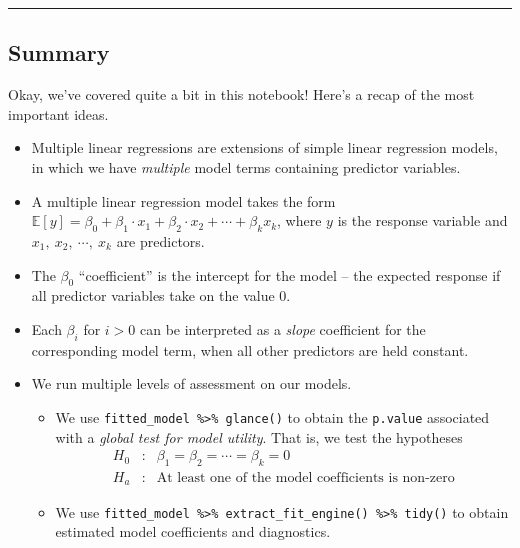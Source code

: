 \documentclass[
  letterpaper,
  DIV=11,
  numbers=noendperiod]{scrartcl}
\begin{document}
\begin{center}\rule{0.5\linewidth}{0.5pt}\end{center}

\subsection{Summary}\label{summary}

Okay, we've covered quite a bit in this notebook! Here's a recap of the
most important ideas.

\begin{itemize}
\item
  Multiple linear regressions are extensions of simple linear regression
  models, in which we have \emph{multiple} model terms containing
  predictor variables.
\item
  A multiple linear regression model takes the form
  \(\mathbb{E}\left[y\right] = \beta_0 + \beta_1\cdot x_1 + \beta_2\cdot x_2 + \cdots + \beta_k x_k\),
  where \(y\) is the response variable and \(x_1,~x_2,~\cdots,~x_k\) are
  predictors.
\item
  The \(\beta_0\) ``coefficient'' is the intercept for the model -- the
  expected response if all predictor variables take on the value \(0\).
\item
  Each \(\beta_i\) for \(i > 0\) can be interpreted as a \emph{slope}
  coefficient for the corresponding model term, when all other
  predictors are held constant.
\item
  We run multiple levels of assessment on our models.

  \begin{itemize}
  \item
    We use \texttt{fitted\_model\ \%\textgreater{}\%\ glance()} to
    obtain the \texttt{p.value} associated with a \emph{global test for
    model utility}. That is, we test the hypotheses
    \[\begin{array}{lcl} H_0 & : & \beta_1 = \beta_2 = \cdots = \beta_k = 0\\ H_a & : & \text{At least one of the model coefficients is non-zero}\end{array}\]
  \item
    We use
    \texttt{fitted\_model\ \%\textgreater{}\%\ extract\_fit\_engine()\ \%\textgreater{}\%\ tidy()}
    to obtain estimated model coefficients and diagnostics.


\end{itemize}
\end{itemize}
\end{document}
